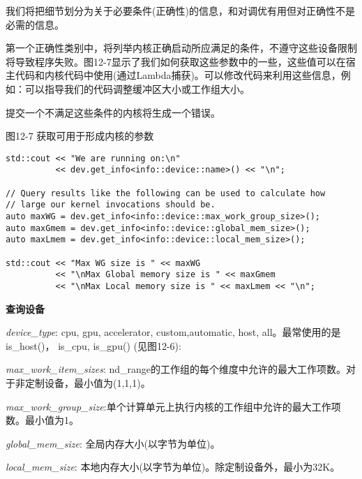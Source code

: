 我们将把细节划分为关于必要条件(正确性)的信息，和对调优有用但对正确性不是必需的信息。\par

第一个正确性类别中，将列举内核正确启动所应满足的条件，不遵守这些设备限制将导致程序失败。图12-7显示了我们如何获取这些参数中的一些，这些值可以在宿主代码和内核代码中使用(通过Lambda捕获)。可以修改代码来利用这些信息，例如：可以指导我们的代码调整缓冲区大小或工作组大小。\par

\begin{tcolorbox}[colback=red!5!white,colframe=red!75!black]
提交一个不满足这些条件的内核将生成一个错误。
\end{tcolorbox}

\hspace*{\fill} \par %
图12-7 获取可用于形成内核的参数
\begin{lstlisting}[caption={}]
std::cout << "We are running on:\n"
		  << dev.get_info<info::device::name>() << "\n";

// Query results like the following can be used to calculate how
// large our kernel invocations should be.
auto maxWG = dev.get_info<info::device::max_work_group_size>();
auto maxGmem = dev.get_info<info::device::global_mem_size>();
auto maxLmem = dev.get_info<info::device::local_mem_size>();

std::cout << "Max WG size is " << maxWG
		  << "\nMax Global memory size is " << maxGmem
		  << "\nMax Local memory size is " << maxLmem << "\n";
\end{lstlisting}

\hspace*{\fill} \par %
\textbf{查询设备}

\textit{device\_type}: cpu, gpu, accelerator, custom,automatic, host, all。最常使用的是is\_host()， is\_cpu, is\_gpu() (见图12-6):\par

\textit{max\_work\_item\_sizes}: nd\_range的工作组的每个维度中允许的最大工作项数。对于非定制设备，最小值为(1,1,1)。\par

\textit{max\_work\_group\_size}:单个计算单元上执行内核的工作组中允许的最大工作项数。最小值为1。\par

\textit{global\_mem\_size}: 全局内存大小(以字节为单位)。\par

\textit{local\_mem\_size}: 本地内存大小(以字节为单位)。除定制设备外，最小为32K。\par

